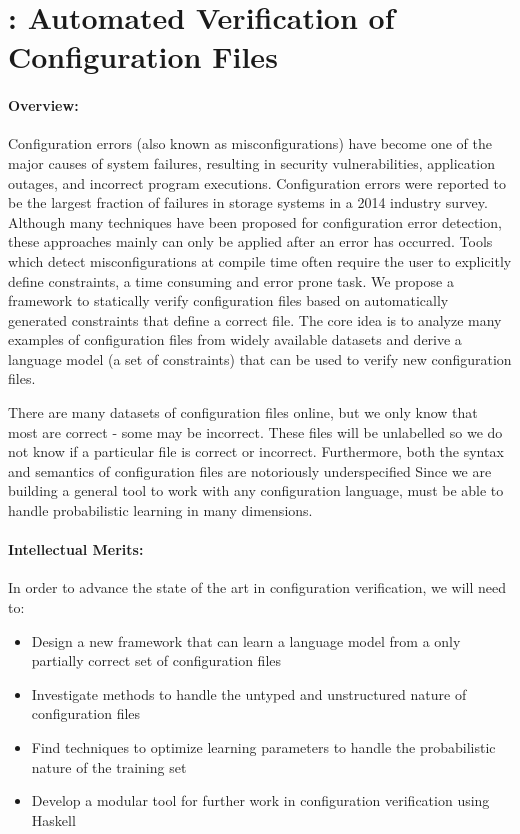\section*{\app: Automated Verification of Configuration Files}
\paragraph{Overview:} 
Configuration errors (also known as misconfigurations) have become one of the major causes of system failures, resulting in security vulnerabilities, application outages, and incorrect program executions. 
Configuration errors were reported to be the largest fraction of failures in storage systems in a 2014 industry survey. 
Although many techniques have been proposed for configuration error detection, these approaches mainly can only be applied after an error has occurred.
Tools which detect misconfigurations at compile time often require the user to explicitly define constraints, a time consuming and error prone task.
We propose a framework to statically verify configuration files based on automatically generated constraints that define a correct file.
The core idea is to analyze many examples of configuration files from widely available datasets and derive a language model (a set of constraints) that can be used to verify new configuration files.

There are many datasets of configuration files online, but we only know that most are correct - some may be incorrect.
These files will be unlabelled so we do not know if a particular file is correct or incorrect.
Furthermore, both the syntax and semantics of configuration files are notoriously underspecified
Since we are building a general tool to work with any configuration language, \app must be able to handle probabilistic learning in many dimensions.

\paragraph{Intellectual Merits:} In order to advance the state of the art in configuration verification, we will need to:

\begin{itemize}
\item Design a new framework that can learn a language model from a only partially correct set of configuration files
\item Investigate methods to handle the untyped and unstructured nature of configuration files
\item Find techniques to optimize learning parameters to handle the probabilistic nature of the training set
\item Develop a modular tool for further work in configuration verification using Haskell
\end{itemize}

